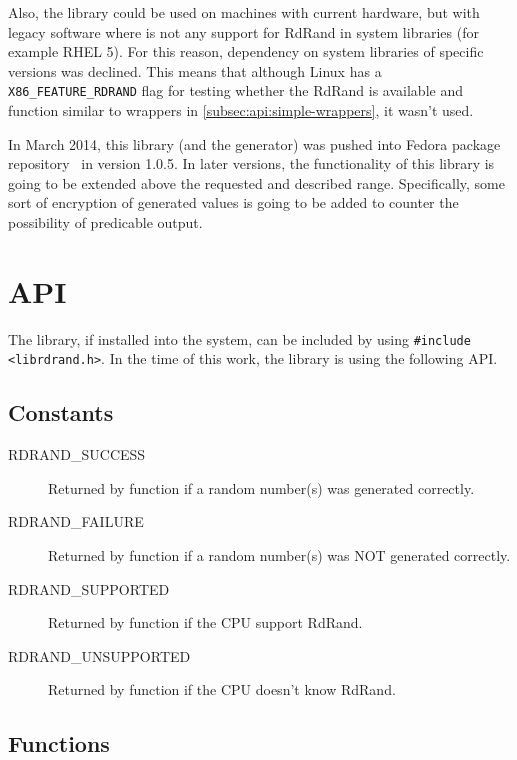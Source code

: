 \par{
Also, the library could be used on machines with current hardware, but with legacy software where is not any support for RdRand in system libraries (for example RHEL 5). For this reason, dependency on system libraries of specific versions was declined. This means that although Linux has a {\tt X86\_FEATURE\_RDRAND} flag for testing whether the RdRand is available and function similar to wrappers in \ref{subsec:api:simple-wrappers}, it wasn't used.
}

\par{
In March 2014, this library (and the generator) was pushed into Fedora package repository~\cite{RdRandFedoraPackage,RdRandFedoraPackageBugzilla} in version 1.0.5. 
In later versions, the functionality of this library is going to be extended above the requested and described range. Specifically, some sort of encryption of generated values is going to be added to counter the possibility of predicable output.
}


\section{API} \label{sec:library-api}
\par{
The library, if installed into the system, can be included by using {\tt \#include <librdrand.h>}. In the time of this work, the library is using the following API.
}
\subsection{Constants}
\begin{description}
  \item[RDRAND\_SUCCESS] Returned by function if a random number(s) was generated correctly.
  \item[RDRAND\_FAILURE] Returned by function if a random number(s) was NOT generated correctly.
  \item[RDRAND\_SUPPORTED] Returned by  function if the CPU support RdRand.
  \item[RDRAND\_UNSUPPORTED] Returned by  function if the CPU doesn't know RdRand.
  
\end{description}


\subsection{Functions}

